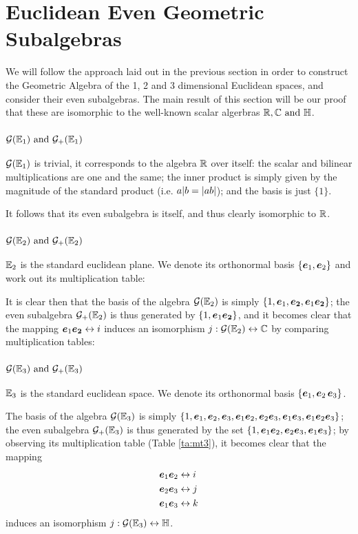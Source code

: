 \section{Euclidean Even Geometric Subalgebras}

We will follow the approach laid out in the previous section in order to construct the Geometric Algebra of the 1, 2 and 3 dimensional Euclidean spaces, and consider their even subalgebras.
The main result of this section will be our proof that these are isomorphic to the well-known scalar algerbras $\R, \C \mathrm{\ and\ } \HM$.

\subsubsection{$\G(\E_1)\ \mathrm{and}\ \G_+(\E_1)$}

$\mathcal{G}(\mathbb{E}_1)$  is trivial, it corresponds to the algebra $\mathbb{R}$ over itself: the scalar and bilinear multiplications are one and the same; the inner product is simply given by the magnitude of the standard product (i.e. $a | b = \left|ab\right|$); and the basis is just $\{1\}$.

It follows that its even subalgebra is itself, and thus clearly isomorphic to $\mathbb{R}$.

\subsubsection{$\G(\E_2)\ \mathrm{and}\ \G_+(\E_2)$}

$\mathbb{E}_2$ is the standard euclidean plane. We denote its orthonormal basis $\{\boldsymbol{e}_1, \boldsymbol{e}_2\}$ and work out its multiplication table:


It is clear then that the basis of the algebra $\mathcal{G}(\mathbb{E}_2)$ is simply $\{1, \boldsymbol{e}_1, \boldsymbol{e_2}, \boldsymbol{e}_1\boldsymbol{e_2}\}$; the even subalgebra $\mathcal{G}_+(\mathbb{E}_2)$ is thus generated by $\{1, \boldsymbol{e}_1\boldsymbol{e_2} \}$, and it becomes clear that the mapping $\boldsymbol{e}_1\boldsymbol{e_2} \leftrightarrow i$ induces an isomorphism $j : \mathcal{G}(\mathbb{E}_2) \leftrightarrow \mathbb{C}$ by comparing multiplication tables:


\subsubsection{$\G(\E_3)\ \mathrm{and}\ \G_+(\E_3)$}
$\mathbb{E}_3$ is the standard euclidean space. We denote its orthonormal basis $\{\boldsymbol{e}_1, \boldsymbol{e}_2\, \boldsymbol{e}_3\}$.

The basis of the algebra $\mathcal{G}(\mathbb{E}_3)$ is simply $\{1, \boldsymbol{e}_1, \boldsymbol{e}_2, \boldsymbol{e}_3, \boldsymbol{e}_1\boldsymbol{e}_2, \boldsymbol{e}_2\boldsymbol{e}_3, \boldsymbol{e}_1\boldsymbol{e}_3, \boldsymbol{e}_1\boldsymbol{e}_2\boldsymbol{e}_3\}$; the even subalgebra $\mathcal{G}_+(\mathbb{E}_3)$ is thus generated by the set $\{1, \boldsymbol{e}_1\boldsymbol{e}_2, \boldsymbol{e}_2\boldsymbol{e}_3, \boldsymbol{e}_1\boldsymbol{e}_3\}$; by observing its multiplication table (Table \ref{ta:mt3}), it becomes clear that the mapping
\begin{align*}
	&\boldsymbol{e}_1\boldsymbol{e}_2 \leftrightarrow i \\
	&\boldsymbol{e}_2\boldsymbol{e}_3 \leftrightarrow j \\
	&\boldsymbol{e}_1\boldsymbol{e}_3 \leftrightarrow k 
\end{align*}
induces an isomorphism $j : \mathcal{G}(\mathbb{E}_3) \leftrightarrow \mathbb{H}$.

